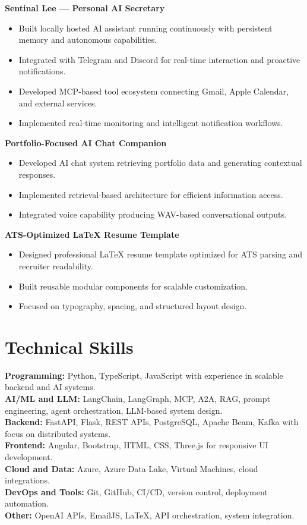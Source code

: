 \documentclass[letterpaper,10pt]{article}
\begin{document}
\textbf{Sentinal Lee — Personal AI Secretary} \\
\begin{itemize}
    \item Built locally hosted AI assistant running continuously with persistent memory and autonomous capabilities.
    \item Integrated with Telegram and Discord for real-time interaction and proactive notifications.
    \item Developed MCP-based tool ecosystem connecting Gmail, Apple Calendar, and external services.
    \item Implemented real-time monitoring and intelligent notification workflows.
\end{itemize}

\textbf{Portfolio-Focused AI Chat Companion} \\
\begin{itemize}
    \item Developed AI chat system retrieving portfolio data and generating contextual responses.
    \item Implemented retrieval-based architecture for efficient information access.
    \item Integrated voice capability producing WAV-based conversational outputs.
\end{itemize}

\textbf{ATS-Optimized LaTeX Resume Template} \\
\begin{itemize}
    \item Designed professional LaTeX resume template optimized for ATS parsing and recruiter readability.
    \item Built reusable modular components for scalable customization.
    \item Focused on typography, spacing, and structured layout design.
\end{itemize}

\section*{Technical Skills}

\textbf{Programming:} Python, TypeScript, JavaScript with experience in scalable backend and AI systems. \\
\textbf{AI/ML and LLM:} LangChain, LangGraph, MCP, A2A, RAG, prompt engineering, agent orchestration, LLM-based system design. \\
\textbf{Backend:} FastAPI, Flask, REST APIs, PostgreSQL, Apache Beam, Kafka with focus on distributed systems. \\
\textbf{Frontend:} Angular, Bootstrap, HTML, CSS, Three.js for responsive UI development. \\
\textbf{Cloud and Data:} Azure, Azure Data Lake, Virtual Machines, cloud integrations. \\
\textbf{DevOps and Tools:} Git, GitHub, CI/CD, version control, deployment automation. \\
\textbf{Other:} OpenAI APIs, EmailJS, LaTeX, API orchestration, system integration.
\end{document}
